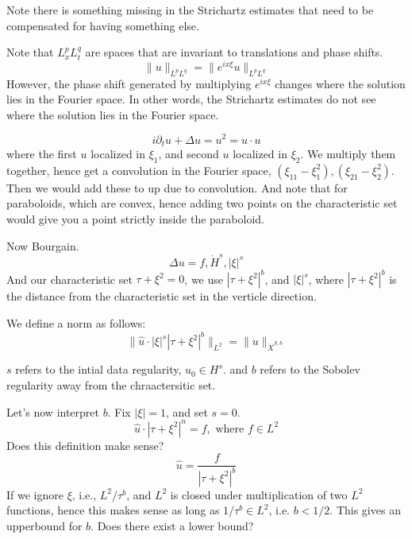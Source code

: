 Note there is something missing in the Strichartz estimates that need to be compensated for having something else.

Note that $L_x^p L_t^q$ are spaces that are invariant to translations and phase shifts.
\begin{equation*}
    \|u\|_{L^pL^q}=\|e^{ix\xi}u\|_{L^pL^q}
\end{equation*}
However, the phase shift generated by multiplying $e^{ix\xi}$ changes where the solution lies in the Fourier space. In other words, the Strichartz estimates do not see where the solution lies in the Fourier space.

\begin{equation*}
    i\partial_t u+\Delta u=u^2=u\cdot u
\end{equation*}
where the first $u$ localized in $\xi_1$, and second $u$ localized in $\xi_2$. We multiply them together, hence get a convolution in the Fourier space, $(\xi_{11}-\xi_1^2), (\xi_{21}-\xi_2^2)$. Then we would add these to up due to convolution. And note that for paraboloids, which are convex, hence adding two points on the characteristic set would give you a point strictly inside the paraboloid.

Now Bourgain.
\begin{equation*}
    \Delta u=f, \dot{H}^s, |\xi|^s
\end{equation*}
And our characteristic set $\tau+\xi^2=0$, we use $|\tau+\xi^2|^b$, and $|\xi|^s$, where $|\tau+\xi^2|^b$ is the distance from the characteristic set in the verticle direction.

\begin{definition}
    We define a norm as follows:
    \begin{equation*}
        \|\widehat{u}\cdot|\xi|^s|\tau+\xi^2|^b\|_{L^2}=\|u\|_{\dot{X}^{S,b}}
    \end{equation*}
\end{definition}
\begin{remark}
    $s$ refers to the intial data regularity, $u_0\in H^s$. and $b$ refers to the Sobolev regularity away from the chraactersitic set.
\end{remark}
Let's now interpret $b$. Fix $|\xi|=1$, and set $s=0$.
\begin{equation*}
    \widehat{u}\cdot |\tau+\xi^2|^n=f, \text{ where } f\in L^2
\end{equation*}
Does this definition make sense?
\begin{equation*}
    \widehat{u}=\frac{f}{|\tau+\xi^2|^b}
\end{equation*}
If we ignore $\xi$, i.e., $L^2/\tau^b$, and $L^2$ is closed under multiplication of two $L^2$ functions, hence this makes sense as long as $1/\tau^b\in L^2$, i.e. $b<1/2$. This gives an upperbound for $b$. Does there exist a lower bound?

